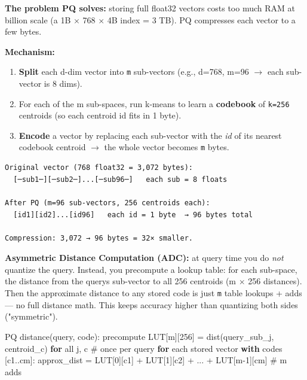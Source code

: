 \documentclass[11pt]{article}
\providecommand{\tightlist}{\setlength{\itemsep}{1pt}\setlength{\parskip}{0pt}}
\newenvironment{Shaded}{\begin{snugshade}}{\end{snugshade}}
\newcommand{\BuiltInTok}[1]{\textcolor[rgb]{0.50,0.55,0.55}{#1}}
\newcommand{\CommentTok}[1]{\textcolor[rgb]{0.48,0.49,0.49}{#1}}
\newcommand{\ControlFlowTok}[1]{\textcolor[rgb]{0.99,0.74,0.29}{\textbf{#1}}}
\newcommand{\DecValTok}[1]{\textcolor[rgb]{0.96,0.45,0.00}{#1}}
\newcommand{\NormalTok}[1]{\textcolor[rgb]{0.81,0.81,0.76}{#1}}
\newcommand{\OperatorTok}[1]{\textcolor[rgb]{0.81,0.81,0.76}{#1}}
\begin{document}
\textbf{The problem PQ solves:} storing full float32 vectors costs too much RAM at billion scale (a 1B \(\times\) 768 \(\times\) 4B index = 3 TB). PQ compresses each vector to a few bytes.

\textbf{Mechanism:}

\begin{enumerate}
\def\labelenumi{\arabic{enumi}.}
\tightlist
\item
  \textbf{Split} each d-dim vector into \texttt{m} sub-vectors (e.g., d=768, m=96 \(\rightarrow\) each sub-vector is 8 dims).
\item
  For each of the m sub-spaces, run k-means to learn a \textbf{codebook} of \texttt{k=256} centroids (so each centroid id fits in 1 byte).
\item
  \textbf{Encode} a vector by replacing each sub-vector with the \emph{id} of its nearest codebook centroid \(\rightarrow\) the whole vector becomes \texttt{m} bytes.
\end{enumerate}

\setcodelang{}

\begin{verbatim}
Original vector (768 float32 = 3,072 bytes):
  [─sub1─][─sub2─]...[─sub96─]   each sub = 8 floats

After PQ (m=96 sub-vectors, 256 centroids each):
  [id1][id2]...[id96]   each id = 1 byte  → 96 bytes total

Compression: 3,072 → 96 bytes = 32× smaller.
\end{verbatim}

\textbf{Asymmetric Distance Computation (ADC):} at query time you do \emph{not} quantize the query. Instead, you precompute a lookup table: for each sub-space, the distance from the query\textquotesingle s sub-vector to all 256 centroids (m \(\times\) 256 distances). Then the approximate distance to any stored code is just \texttt{m} table lookups + adds --- no full distance math. This keeps accuracy higher than quantizing both sides ("symmetric").


\begin{Shaded}
\begin{Highlighting}[]
\NormalTok{PQ distance(query, code):}
\NormalTok{  precompute LUT[m][}\DecValTok{256}\NormalTok{] }\OperatorTok{=}\NormalTok{ dist(query\_sub\_j, centroid\_c) }\ControlFlowTok{for} \BuiltInTok{all}\NormalTok{ j, c   }\CommentTok{\# once per query}
  \ControlFlowTok{for}\NormalTok{ each stored vector }\ControlFlowTok{with}\NormalTok{ codes [c1..cm]:}
\NormalTok{      approx\_dist }\OperatorTok{=}\NormalTok{ LUT[}\DecValTok{0}\NormalTok{][c1] }\OperatorTok{+}\NormalTok{ LUT[}\DecValTok{1}\NormalTok{][c2] }\OperatorTok{+}\NormalTok{ ... }\OperatorTok{+}\NormalTok{ LUT[m}\OperatorTok{{-}}\DecValTok{1}\NormalTok{][cm]        }\CommentTok{\# m adds}
\end{Highlighting}
\end{Shaded}
\end{document}

